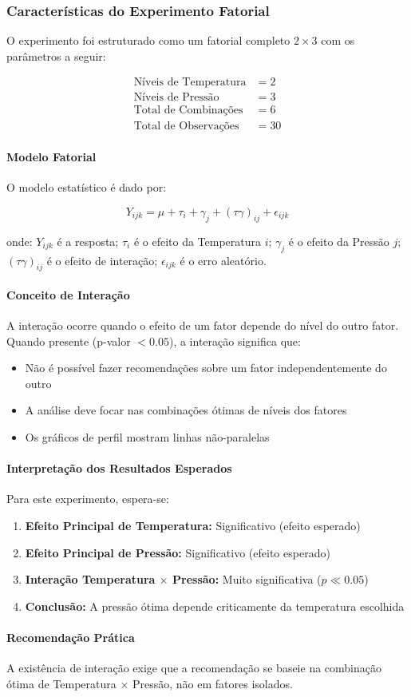 \subsubsection{Características do Experimento Fatorial}

O experimento foi estruturado como um fatorial completo $2 \times 3$ com os parâmetros a seguir:

\begin{align*}
\text{Níveis de Temperatura} &= 2 \\
\text{Níveis de Pressão} &= 3 \\
\text{Total de Combinações} &= 6 \\
\text{Total de Observações} &= 30
\end{align*}

\paragraph{Modelo Fatorial}
O modelo estatístico é dado por:

\[Y_{ijk} = \mu + \tau_i + \gamma_j + (\tau\gamma)_{ij} + \epsilon_{ijk}\]

onde: $Y_{ijk}$ é a resposta; $\tau_i$ é o efeito da Temperatura $i$; $\gamma_j$ é o efeito da Pressão $j$; $(\tau\gamma)_{ij}$ é o efeito de interação; $\epsilon_{ijk}$ é o erro aleatório.

\paragraph{Conceito de Interação}
A interação ocorre quando o efeito de um fator depende do nível do outro fator. Quando presente (p-valor $< 0.05$), a interação significa que:

\begin{itemize}
\item Não é possível fazer recomendações sobre um fator independentemente do outro
\item A análise deve focar nas combinações ótimas de níveis dos fatores
\item Os gráficos de perfil mostram linhas não-paralelas
\end{itemize}

\paragraph{Interpretação dos Resultados Esperados}
Para este experimento, espera-se:

\begin{enumerate}
\item \textbf{Efeito Principal de Temperatura:} Significativo (efeito esperado)
\item \textbf{Efeito Principal de Pressão:} Significativo (efeito esperado)
\item \textbf{Interação Temperatura $\times$ Pressão:} Muito significativa ($p \ll 0.05$)
\item \textbf{Conclusão:} A pressão ótima depende criticamente da temperatura escolhida
\end{enumerate}

\paragraph{Recomendação Prática}
A existência de interação exige que a recomendação se baseie na combinação ótima de Temperatura $\times$ Pressão, não em fatores isolados.

